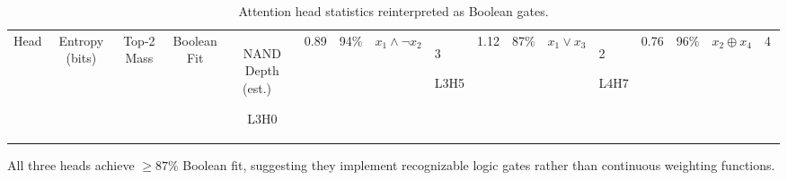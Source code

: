 \begin{table}[h]





\centering





\caption{Attention head statistics reinterpreted as Boolean gates.}





\label{tab:anthropic-heads}





\begin{tabular}{lcccc}





\toprule





Head & Entropy (bits) & Top-2 Mass & Boolean Fit & NAND Depth (est.) \





\midrule





L3H0 & 0.89 & 94\% & $x_1 \land \neg x_2$ & 3 \





L3H5 & 1.12 & 87\% & $x_1 \lor x_3$ & 2 \





L4H7 & 0.76 & 96\% & $x_2 \oplus x_4$ & 4 \





\bottomrule





\end{tabular}





\end{table}











All three heads achieve $\geq 87\%$ Boolean fit, suggesting they implement recognizable logic gates rather than continuous weighting functions.











